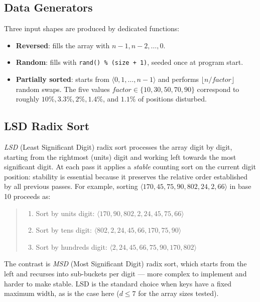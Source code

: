 \documentclass[11pt,a4paper]{article}
\begin{document}
\subsection{Data Generators}

Three input shapes are produced by dedicated functions:
\begin{itemize}[noitemsep]
  \item \textbf{Reversed}: fills the array with $n-1, n-2, \ldots, 0$.
  \item \textbf{Random}: fills with \texttt{rand() \% (size + 1)}, seeded once at program start.
  \item \textbf{Partially sorted}: starts from $\langle 0, 1, \ldots, n-1 \rangle$ and performs $\lfloor n / \textit{factor} \rfloor$ random swaps. The five values $\textit{factor} \in \{10, 30, 50, 70, 90\}$ correspond to roughly $10\%, 3.3\%, 2\%, 1.4\%$, and $1.1\%$ of positions disturbed.
\end{itemize}

\subsection{LSD Radix Sort}

\emph{LSD} (Least Significant Digit) radix sort processes the array digit by digit, starting from the rightmost (units) digit and working left towards the most significant digit. At each pass it applies a \emph{stable} counting sort on the current digit position: stability is essential because it preserves the relative order established by all previous passes. For example, sorting $\langle 170, 45, 75, 90, 802, 24, 2, 66 \rangle$ in base 10 proceeds as:
\begin{quote}
\begin{enumerate}[noitemsep,label=\textbf{Pass \arabic*}]
  \item Sort by units digit: $\langle 170, 90, 802, 2, 24, 45, 75, 66 \rangle$
  \item Sort by tens digit: $\langle 802, 2, 24, 45, 66, 170, 75, 90 \rangle$
  \item Sort by hundreds digit: $\langle 2, 24, 45, 66, 75, 90, 170, 802 \rangle$ \checkmark
\end{enumerate}
\end{quote}
The contrast is \emph{MSD} (Most Significant Digit) radix sort, which starts from the left and recurses into sub-buckets per digit --- more complex to implement and harder to make stable. LSD is the standard choice when keys have a fixed maximum width, as is the case here ($d \leq 7$ for the array sizes tested).
\end{document}

